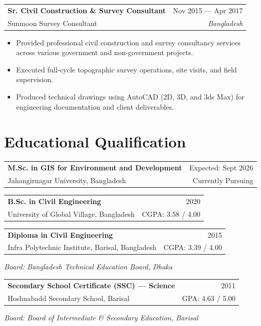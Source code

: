 \documentclass[11pt, a4paper]{article}
\makeatletter
\newcommand{\cventry}[4]{%
  \begin{tabularx}{\linewidth}{@{}X r@{}}
    {\bfseries\color{ddseNavy} #1} & {\small\color{ddseMid} #3} \\
    {\color{ddseBlue}\small #2}    & {\small\color{ddseMid}\textit{#4}} \\
  \end{tabularx}%
}
\newcommand{\eduentry}[4]{%
  \begin{tabularx}{\linewidth}{@{}X r@{}}
    {\bfseries\color{ddseNavy} #1} & {\small\color{ddseMid} #3} \\
    {\color{ddseBlue}\small #2}    & {\small\color{ddseMid} #4} \\
  \end{tabularx}%
}
\makeatother
\begin{document}
\vspace{8pt}

\cventry{Sr. Civil Construction \& Survey Consultant}{Sunmoon Survey Consultant}{Nov 2015 — Apr 2017}{Bangladesh}

\vspace{4pt}
\begin{itemize}[leftmargin=1.4em, itemsep=2pt, topsep=2pt]
  \item Provided professional civil construction and survey consultancy services across
        various government and non-government projects.
  \item Executed full-cycle topographic survey operations, site visits, and field supervision.
  \item Produced technical drawings using AutoCAD (2D, 3D, and 3ds Max) for
        engineering documentation and client deliverables.
\end{itemize}

\vspace{4pt}

\section{Educational Qualification}

\eduentry{M.Sc. in GIS for Environment and Development}{Jahangirnagar University, Bangladesh}{Expected: Sept 2026}{Currently Pursuing}

\vspace{6pt}
\eduentry{B.Sc. in Civil Engineering}{University of Global Village, Bangladesh}{2020}{CGPA: 3.58 / 4.00}

\vspace{6pt}
\eduentry{Diploma in Civil Engineering}{Infra Polytechnic Institute, Barisal, Bangladesh}{2015}{CGPA: 3.39 / 4.00}

{\small\color{ddseMid}\hspace{0.5em}\textit{Board: Bangladesh Technical Education Board, Dhaka}}

\vspace{6pt}
\eduentry{Secondary School Certificate (SSC) — Science}{Hoshnabadd Secondary School, Barisal}{2011}{GPA: 4.63 / 5.00}

{\small\color{ddseMid}\hspace{0.5em}\textit{Board: Board of Intermediate \& Secondary Education, Barisal}}

\vspace{4pt}
\end{document}
